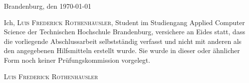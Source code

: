 \thispagestyle{empty}

\large
\begin{flushright}
  Brandenburg, den \today
\end{flushright}

\vspace*{50mm}
Ich, {\scshape Luis Frederick Rothenhäusler}, Student im Studiengang Applied Computer Science der Technischen Hochschule Brandenburg, versichere an Eides statt, dass die vorliegende Abschlussarbeit selbstständig verfasst und nicht mit anderen als den
angegebenen Hilfsmitteln erstellt wurde.
Sie wurde in dieser oder ähnlicher Form noch keiner Prüfungskommission vorgelegt.

\vspace*{50mm}

\begin{flushright}
  {\scshape Luis Frederick Rothenhäusler}
\end{flushright}

\normalsize